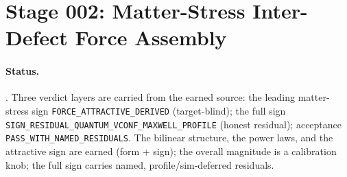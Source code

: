 \section{Stage 002: Matter-Stress Inter-Defect Force Assembly}

\claimstatus{\StatusReduced}

\paragraph{Status.}
\StatusReduced. Three verdict layers are carried from the earned source: the
leading matter-stress sign \texttt{FORCE\_ATTRACTIVE\_DERIVED} (target-blind);
the full sign \texttt{SIGN\_RESIDUAL\_QUANTUM\_VCONF\_MAXWELL\_PROFILE} (honest
residual); acceptance \texttt{PASS\_WITH\_NAMED\_RESIDUALS}. The bilinear
structure, the power laws, and the attractive sign are earned (form + sign); the
overall magnitude is a calibration knob; the full sign carries named,
profile/sim-deferred residuals.


